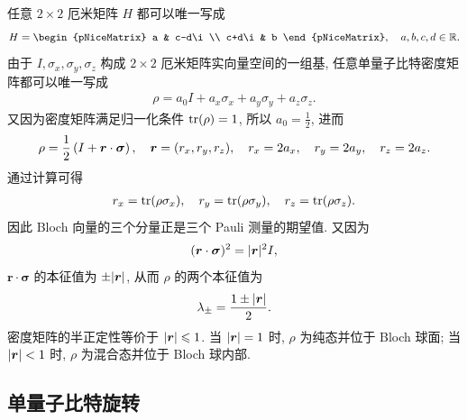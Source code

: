 \documentclass[a4paper]{ctexart}
\begin{document}
任意 $2\times2$ 厄米矩阵 $H$ 都可以唯一写成
\begin{align}
    H=\begin{pNiceMatrix}
          a     & c-d\i \\
          c+d\i & b
      \end{pNiceMatrix}, \q a,b,c,d\in\R.
\end{align}
由于 $I,\sigma_x,\sigma_y,\sigma_z$ 构成 $2\times2$ 厄米矩阵实向量空间的一组基, 任意单量子比特密度矩阵都可以唯一写成
\begin{align}
    \rho=a_0I+a_x\sigma_x+a_y\sigma_y+a_z\sigma_z.
\end{align}
又因为密度矩阵满足归一化条件 $\operatorname{tr}(\rho)=1$, 所以 $a_0=\frac{1}{2}$, 进而
\begin{align}
    \rho=\frac{1}{2}\left(I+\bm{r}\cdot\bm{\sigma}\right), \quad \bm{r}=(r_x,r_y,r_z), \quad r_x=2a_x,\quad r_y=2a_y,\quad r_z=2a_z.
\end{align}
通过计算可得
\begin{align}
    r_x=\operatorname{tr}(\rho\sigma_x), \quad r_y=\operatorname{tr}(\rho\sigma_y), \quad r_z=\operatorname{tr}(\rho\sigma_z).
\end{align}
因此 Bloch 向量的三个分量正是三个 Pauli 测量的期望值. 又因为
\begin{align}
    (\bm r\cdot\bm\sigma)^2=\lvert\bm r\rvert^2I,
\end{align}
$\bm r\cdot\bm\sigma$ 的本征值为 $\pm\lvert\bm r\rvert$, 从而 $\rho$ 的两个本征值为
\begin{align}
    \lambda_\pm=\frac{1\pm\lvert\bm r\rvert}{2}.
\end{align}
密度矩阵的半正定性等价于 $\lvert\bm r\rvert\leqslant1$. 当 $\lvert\bm r\rvert=1$ 时, $\rho$ 为纯态并位于 Bloch 球面; 当 $\lvert\bm r\rvert<1$ 时, $\rho$ 为混合态并位于 Bloch 球内部.

\subsection{单量子比特旋转}
\end{document}
